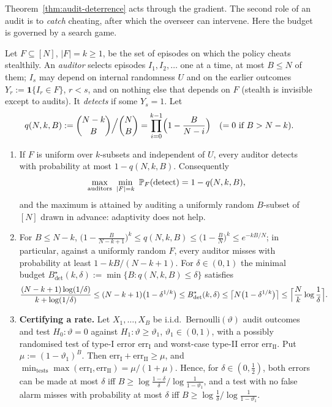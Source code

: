 Theorem~\ref{thm:audit-deterrence} acts through the gradient. The second role
of an audit is to \emph{catch} cheating, after which the overseer can
intervene. Here the budget is governed by a search game.

\begin{theorem}\label{thm:audit-detection}
Let $F\subseteq[N]$, $|F|=k\ge1$, be the set of episodes on which the policy
cheats stealthily. An \emph{auditor} selects episodes $I_1,I_2,\dots$ one at a
time, at most $B\le N$ of them; $I_s$ may depend on internal randomness $U$ and
on the earlier outcomes $Y_r:=\mathbf 1\{I_r\in F\}$, $r<s$, and on nothing else
that depends on $F$ (stealth is invisible except to audits). It \emph{detects}
if some $Y_s=1$. Let
\[
  q(N,k,B):=\binom{N-k}{B}\Big/\binom{N}{B}=\prod_{i=0}^{k-1}\Bigl(1-\frac{B}{N-i}\Bigr)
  \quad(\text{$=0$ if $B>N-k$}).
\]
\begin{enumerate}
\item[\textup{(a)}] If $F$ is uniform over $k$-subsets and independent of $U$,
every auditor detects with probability at most $1-q(N,k,B)$. Consequently
\[
  \max_{\text{auditors}}\ \min_{|F|=k}\ \Prob_F(\text{detect})=1-q(N,k,B),
\]
and the maximum is attained by auditing a uniformly random $B$-subset of
$[N]$ drawn in advance: adaptivity does not help.
\item[\textup{(b)}] For $B\le N-k$,
$\bigl(1-\tfrac{B}{N-k+1}\bigr)^k\le q(N,k,B)\le\bigl(1-\tfrac BN\bigr)^k\le e^{-kB/N}$;
in particular, against a uniformly random $F$, every auditor misses with
probability at least $1-kB/(N-k+1)$. For $\delta\in(0,1)$ the minimal budget
$B^\star_{\mathrm{det}}(k,\delta):=\min\{B:q(N,k,B)\le\delta\}$ satisfies
\[
 \frac{(N-k+1)\log(1/\delta)}{k+\log(1/\delta)}\le
 (N-k+1)\bigl(1-\delta^{1/k}\bigr)\le B^\star_{\mathrm{det}}(k,\delta)\le
 \bigl\lceil N\bigl(1-\delta^{1/k}\bigr)\bigr\rceil\le
 \Bigl\lceil\frac Nk\log\frac1\delta\Bigr\rceil .
\]
\item[\textup{(c)}] \textbf{Certifying a rate.} Let $X_1,\dots,X_B$ be i.i.d.\
Bernoulli$(\vartheta)$ audit outcomes and test
$H_0:\vartheta=0$ against $H_1:\vartheta\ge\vartheta_1$, $\vartheta_1\in(0,1)$,
with a possibly randomised test of type-I error $\mathrm{err}_{\mathrm I}$ and worst-case type-II
error $\mathrm{err}_{\mathrm{II}}$. Put $\mu:=(1-\vartheta_1)^B$. Then $\mathrm{err}_{\mathrm I}+\mathrm{err}_{\mathrm{II}}\ge\mu$, and
$\min_{\text{tests}}\max(\mathrm{err}_{\mathrm I},\mathrm{err}_{\mathrm{II}})=\mu/(1+\mu)$. Hence, for
$\delta\in(0,\tfrac12)$, both errors can be made at most $\delta$ iff
$B\ge\log\frac{1-\delta}{\delta}\big/\log\frac1{1-\vartheta_1}$, and a test with
no false alarm misses with probability at most $\delta$ iff
$B\ge\log\frac1\delta\big/\log\frac1{1-\vartheta_1}$.
\end{enumerate}
\end{theorem}

